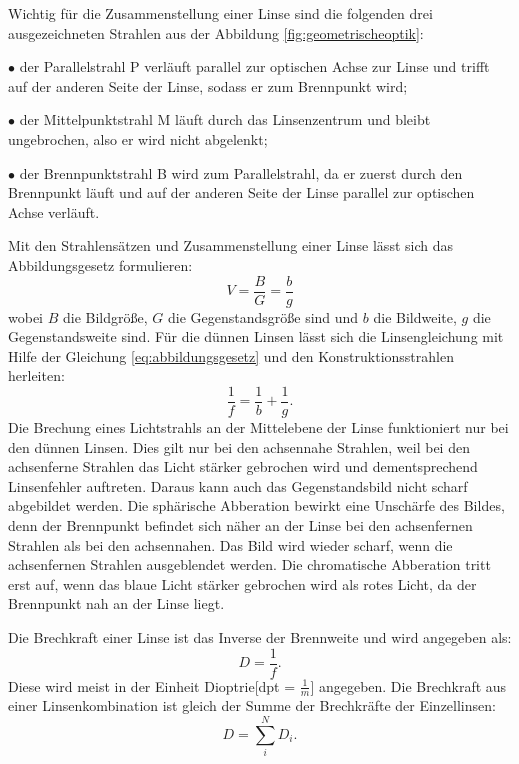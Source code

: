 Wichtig für die Zusammenstellung einer Linse sind die folgenden drei ausgezeichneten Strahlen aus der Abbildung \ref{fig:geometrischeoptik}: 

$\bullet$ der Parallelstrahl P verläuft parallel zur optischen Achse zur Linse und trifft auf der anderen Seite der Linse, sodass er zum Brennpunkt wird;

$\bullet$ der Mittelpunktstrahl M läuft durch das Linsenzentrum und bleibt ungebrochen, also er wird nicht abgelenkt;

$\bullet$ der Brennpunktstrahl B wird zum Parallelstrahl, da er zuerst durch den Brennpunkt läuft und auf der anderen Seite der Linse parallel zur optischen Achse verläuft.

Mit den Strahlensätzen und Zusammenstellung einer Linse lässt sich das Abbildungsgesetz formulieren:
\begin{equation}
\label{eq:abbildungsgesetz}
V = \frac{B}{G} = \frac{b}{g}
\end{equation}
wobei $B$ die Bildgröße, $G$ die Gegenstandsgröße sind und $b$ die Bildweite, $g$ die Gegenstandsweite sind. 
Für die dünnen Linsen lässt sich die Linsengleichung mit Hilfe der Gleichung \ref{eq:abbildungsgesetz} und den Konstruktionsstrahlen herleiten:
\begin{equation}
\label{eq:linsengleichung}
\frac{1}{f} = \frac{1}{b} + \frac{1}{g}.
\end{equation}
Die Brechung eines Lichtstrahls an der Mittelebene der Linse funktioniert nur bei den dünnen Linsen. Dies gilt nur bei den achsennahe Strahlen, weil bei den achsenferne Strahlen das Licht stärker gebrochen wird und dementsprechend Linsenfehler auftreten. Daraus kann auch das Gegenstandsbild nicht scharf abgebildet werden. Die sphärische Abberation bewirkt eine Unschärfe des Bildes, denn der Brennpunkt befindet sich näher an der Linse bei den achsenfernen Strahlen als bei den achsennahen. Das Bild wird wieder scharf, wenn die achsenfernen Strahlen ausgeblendet werden. Die chromatische Abberation tritt erst auf, wenn das blaue Licht stärker gebrochen wird als rotes Licht, da der Brennpunkt nah an der Linse liegt. 

Die Brechkraft einer Linse ist das Inverse der Brennweite und wird angegeben als:
\begin{equation*}
D = \frac{1}{f}.
\end{equation*} 
Diese wird meist in der Einheit Dioptrie[dpt = $\frac{1}{m}$] angegeben. Die Brechkraft aus einer Linsenkombination ist gleich der Summe der Brechkräfte der Einzellinsen:
\begin{equation}
D = \sum_{i}^N D_i.
\end{equation} 

